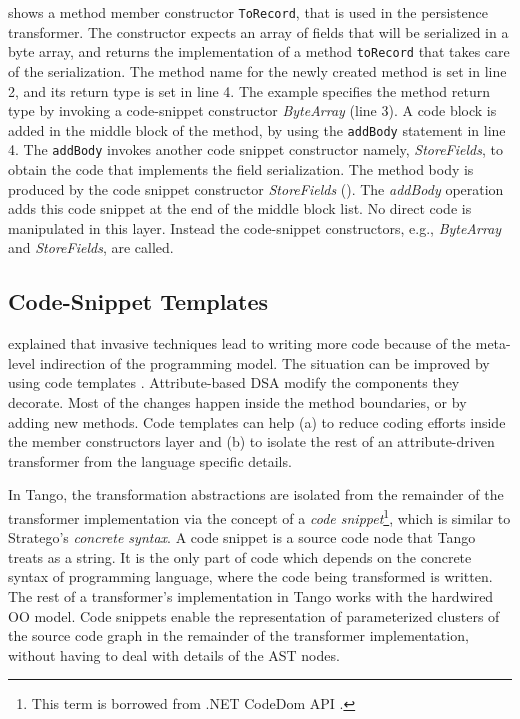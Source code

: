  shows a method member constructor \texttt{To\-Re\-cord}, that is used in the persistence transformer. The constructor expects an array of fields that will be serialized in a byte array, and returns the implementation of a method \texttt{toRecord} that takes care of the serialization. The method name for the newly created method is set in line 2, and its return type is set in line 4. The example specifies the method return type by invoking a code-snippet constructor \textit{ByteArray} (line 3). A code block is added in the middle block of the method, by using the \texttt{addBody} statement in line 4. The \texttt{addBody} invokes another code snippet constructor namely, \textit{StoreFields}, to obtain the code that implements the field serialization. The method body is produced by the code snippet constructor \textit{StoreFields} (). The \textit{addBody} operation adds this code snippet at the end of the middle block list. No direct code is manipulated in this layer. Instead the code-snippet constructors, e.g., \textit{ByteArray} and \textit{StoreFields}, are called.

\subsection{Code-Snippet Templates}

 explained that invasive techniques lead to writing more code because of the meta-level indirection of the programming model. The situation can be improved by using code templates \cite{voelter.generation,java.compost}. Attribute-based DSA modify the components they decorate. Most of the changes happen inside the method boundaries, or by adding new methods. Code templates can help (a) to reduce coding efforts inside the member constructors layer and (b) to isolate the rest of an attribute-driven transformer from the language specific details.

In Tango, the transformation abstractions are isolated from the remainder of the transformer implementation via the concept of a \textit{code snippet}\footnote{This term is borrowed from .NET CodeDom API \cite{cdom}.}, which is similar to Stratego's \cite{stratego.01} \textit{concrete syntax}. A code snippet is a source code node that Tango treats as a string. It is the only part of code which depends on the concrete syntax of programming language, where the code being transformed is written. The rest of a transformer's implementation in Tango works with the hardwired OO model. Code snippets enable the representation of parameterized clusters of the source code graph in the remainder of the transformer implementation, without having to deal with details of the AST nodes.

